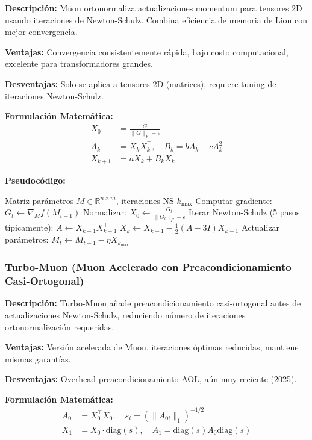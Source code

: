 \documentclass[11pt,a4paper]{article}
\begin{document}
\textbf{Descripción:} Muon ortonormaliza actualizaciones momentum para tensores 2D usando iteraciones de Newton-Schulz. Combina eficiencia de memoria de Lion con mejor convergencia.

\textbf{Ventajas:} Convergencia consistentemente rápida, bajo costo computacional, excelente para transformadores grandes.

\textbf{Desventajas:} Solo se aplica a tensores 2D (matrices), requiere tuning de iteraciones Newton-Schulz.

\textbf{Formulación Matemática:}
\begin{align}
X_0 &= \frac{G}{\|G\|_F + \epsilon} \\
A_k &= X_k X_k^\top, \quad B_k = bA_k + cA_k^2 \\
X_{k+1} &= a X_k + B_k X_k
\end{align}

\textbf{Pseudocódigo:}
\begin{algorithm}
\caption{Muon --- Momentum con Ortonormalización}
\begin{algorithmic}[1]
\Require Matriz parámetros $M \in \mathbb{R}^{n \times m}$, iteraciones NS $k_{\max}$
\State Computar gradiente: $G_t \gets \nabla_M f(M_{t-1})$
\State Normalizar: $X_0 \gets \frac{G_t}{\|G_t\|_F + \epsilon}$
\State Iterar Newton-Schulz (5 pasos típicamente):
\State $A \gets X_{k-1} X_{k-1}^\top$
\State $X_k \gets X_{k-1} - \frac{1}{2}(A - 3I) X_{k-1}$
\EndFor
\State Actualizar parámetros: $M_t \gets M_{t-1} - \eta X_{k_{\max}}$
\EndFor
\end{algorithmic}
\end{algorithm}

\subsubsection{Turbo-Muon (Muon Acelerado con Preacondicionamiento Casi-Ortogonal)}

\textbf{Descripción:} Turbo-Muon añade preacondicionamiento casi-ortogonal antes de actualizaciones Newton-Schulz, reduciendo número de iteraciones ortonormalización requeridas.

\textbf{Ventajas:} Versión acelerada de Muon, iteraciones óptimas reducidas, mantiene mismas garantías.

\textbf{Desventajas:} Overhead preacondicionamiento AOL, aún muy reciente (2025).

\textbf{Formulación Matemática:}
\begin{align}
A_0 &= X_0^\top X_0, \quad s_i = (\|A_{0i}\|_1)^{-1/2} \\
X_1 &= X_0 \cdot \text{diag}(s), \quad A_1 = \text{diag}(s) A_0 \text{diag}(s)
\end{align}
\end{document}
